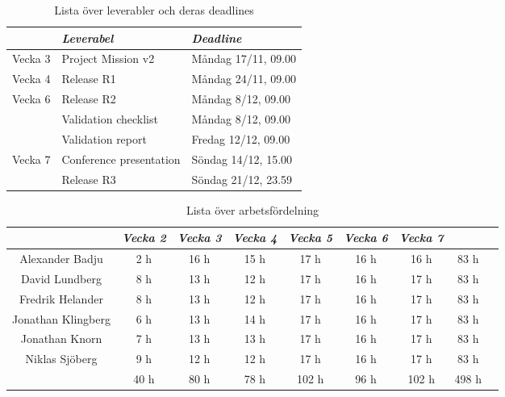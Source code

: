 \documentclass[10pt]{article}
\begin{document}
\begin{table}[htbp] %
  \begin{center}
    \begin{tabular}{l|ll}
      & \emph{Leverabel} & \emph{Deadline} \\ \hline
      Vecka 3      & Project Mission v2        & Måndag 17/11, 09.00 \\
      Vecka 4      & Release R1                & Måndag 24/11, 09.00 \\
      Vecka 6      & Release R2                & Måndag 8/12,  09.00 \\
                    & Validation checklist      & Måndag 8/12, 09.00 \\
                    & Validation report         & Fredag 12/12, 09.00 \\
      Vecka 7      & Conference presentation   & Söndag 14/12, 15.00 \\
                    & Release R3                & Söndag 21/12, 23.59 \\

     \hline 
    \end{tabular}
  \end{center}
  \caption{Lista över leverabler och deras deadlines}
\end{table}

\begin{table}[htbp]
    \begin{center}
        \begin{tabular}{ |c|c|c|c|c|c|c||c|c| }
        \hline
         & \emph{Vecka 2} & \emph{Vecka 3} & \emph{Vecka 4} & \emph{Vecka 5} &              \emph{Vecka 6} & \emph{Vecka 7} & \\
        \hline
        Alexander Badju & 2 h & 16 h & 15 h & 17 h & 16 h & 16 h & 83 h\\
        David Lundberg & 8 h & 13 h & 12 h & 17 h & 16 h & 17 h & 83 h\\
        Fredrik Helander & 8 h & 13 h & 12 h & 17 h & 16 h & 17 h & 83 h\\
        Jonathan Klingberg & 6 h & 13 h & 14 h & 17 h & 16 h & 17 h & 83 h\\
        Jonathan Knorn & 7 h & 13 h & 13 h & 17 h & 16 h & 17 h & 83 h\\
        Niklas Sjöberg & 9 h & 12 h & 12 h & 17 h & 16 h & 17 h & 83 h\\
        \hline
        \hline
         & 40 h & 80 h & 78 h & 102 h & 96 h & 102 h & 498 h\\
        \hline
        \end{tabular}
    \end{center}
    \caption{Lista över arbetsfördelning}
\end{table}
\end{document}
